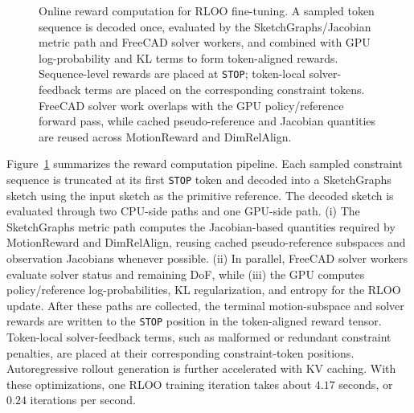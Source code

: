 \begin{figure}[t]
{}
    \caption{Online reward computation for RLOO fine-tuning. A sampled token sequence is decoded once, evaluated by the SketchGraphs/Jacobian metric path and FreeCAD solver workers, and combined with GPU log-probability and KL terms to form token-aligned rewards. Sequence-level rewards are placed at \texttt{STOP}; token-local solver-feedback terms are placed on the corresponding constraint tokens. FreeCAD solver work overlaps with the GPU policy/reference forward pass, while cached pseudo-reference and Jacobian quantities are reused across MotionReward and DimRelAlign.}
    \label{fig:appendix_rl_pipeline}
\end{figure}

Figure~\ref{fig:appendix_rl_pipeline} summarizes the reward computation pipeline. Each sampled constraint sequence is truncated at its first \texttt{STOP} token and decoded into a SketchGraphs sketch using the input sketch as the primitive reference. The decoded sketch is evaluated through two CPU-side paths and one GPU-side path. (i) The SketchGraphs metric path computes the Jacobian-based quantities required by MotionReward and DimRelAlign, reusing cached pseudo-reference subspaces and observation Jacobians whenever possible. (ii) In parallel, FreeCAD solver workers evaluate solver status and remaining DoF, while (iii) the GPU computes policy/reference log-probabilities, KL regularization, and entropy for the RLOO update. After these paths are collected, the terminal motion-subspace and solver rewards are written to the \texttt{STOP} position in the token-aligned reward tensor. Token-local solver-feedback terms, such as malformed or redundant constraint penalties, are placed at their corresponding constraint-token positions.
Autoregressive rollout generation is further accelerated with KV caching. With these optimizations, one RLOO training iteration takes about $4.17$ seconds, or $0.24$ iterations per second.

